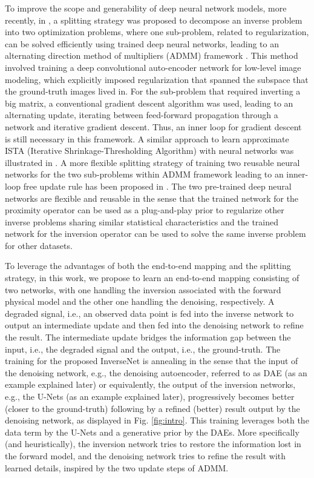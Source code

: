 \documentclass[10pt,twocolumn,letterpaper]{article}
\begin{document}
To improve the scope and generability of deep neural network models, more recently, in \cite{chang2017one}, a splitting strategy was proposed to decompose an inverse problem into two optimization problems, where one sub-problem, related to regularization, can be solved efficiently using trained deep neural networks, leading to an alternating direction method of multipliers (ADMM) framework \cite{Boyd2011,7879849}. This method involved training a deep convolutional auto-encoder network for low-level image modeling, which explicitly imposed regularization that spanned the subspace that the ground-truth images lived in. For the sub-problem that required inverting a big matrix, a conventional gradient descent algorithm was used, leading to an alternating update, iterating between feed-forward propagation through a network and iterative gradient descent. 
Thus, an inner loop for gradient descent is still necessary in this framework. 
A similar approach to learn approximate ISTA (Iterative Shrinkage-Thresholding Algorithm) with neural networks was illustrated in \cite{gregor2010learning}. A more flexible splitting strategy of training two reusable neural networks 
for the two sub-problems within ADMM framework leading to an inner-loop free update rule has been proposed 
in \cite{ADMM2017NIPS}. The two pre-trained deep neural networks are flexible and reusable in the sense that the trained network for the proximity operator can be used as a plug-and-play prior to regularize other inverse problems sharing similar statistical characteristics and the trained network for the inversion operator can be used to solve the same inverse problem for other datasets. 

To leverage the advantages of both the end-to-end mapping and the splitting strategy, in this work, we propose to
learn an end-to-end mapping consisting of two networks, with one handling the inversion associated with the forward physical model 
and the other one handling the denoising, respectively. A degraded signal, i.e., an observed data point is fed into the inverse network 
to output an intermediate update and then fed into the denoising network to refine the result. The intermediate update bridges the
information gap between the input, i.e., the degraded signal and the output, i.e., the ground-truth. The training for the proposed InverseNet is annealing in the sense that the input of the denoising network, e.g., the denoising autoencoder, referred to as DAE (as an example explained later) or equivalently, the output of the inversion networks, e.g., the U-Nets (as an example explained later), progressively becomes better (closer to the ground-truth) following by a refined (better) result output by the denoising network, as displayed in Fig. \ref{fig:intro}. This training leverages both the data term by the U-Nets and a generative prior by the DAEs. 
More specifically (and heuristically), the inversion network tries to restore the information lost in the forward model, and the denoising network tries to refine the result with learned details, inspired by the two update steps of ADMM.  
\end{document}
